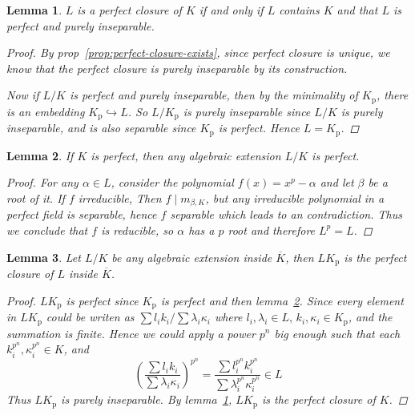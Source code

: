 \documentclass[a4paper]{article}
\newtheorem{lemma}{Lemma}
\theoremstyle{remark}
\theoremstyle{definition}
\theoremstyle{definition}
\theoremstyle{plain}
\begin{document}
  \begin{lemma} \label{lemma:perfect-closure-char}
    $L$ is a perfect closure of $K$ if and only if $L$ contains $K$ and that $L$ is perfect and
    purely inseparable.

    \begin{proof}
      By prop~\ref{prop:perfect-closure-exists}, since perfect closure is unique,
      we know that the perfect closure is purely inseparable by its construction.

      Now if $L/K$ is perfect and purely inseparable, then by the minimality of $K_\text{p}$,
      there is an embedding $K_\text{p} \hookrightarrow L$. So $L/K_\text{p}$ is purely inseparable
      since $L/K$ is purely inseparable, and is also separable since $K_\text{p}$ is perfect.
      Hence $L = K_\text{p}$.
    \end{proof}
  \end{lemma}

  \begin{lemma} \label{lemma:alg-ext-of-perfect-is-perfect}
    If $K$ is perfect, then any algebraic extension $L/K$ is perfect.

    \begin{proof}
      For any $\alpha \in L$, consider the polynomial $f(x) = x^p - \alpha$ and let $\beta$ be a
      root of it. If $f$ irreducible, Then $f \mid m_{\beta, K}$, but any irreducible polynomial in a perfect field
      is separable, hence $f$ separable which leads to an contradiction. Thus we conclude that $f$ is
      reducible, so $\alpha$ has a $p$ root and therefore $L^p = L$.
    \end{proof}
  \end{lemma}

  \begin{lemma} \label{lemma:perfect-closure-of-ext}
    Let $L/K$ be any algebraic extension inside $\overline{K}$, then $L K_\text{p}$ is
    the perfect closure of $L$ inside $\overline{K}$.

    \begin{proof}
      $L K_\text{p}$ is perfect since $K_\text{p}$ is perfect and then lemma~\ref{lemma:alg-ext-of-perfect-is-perfect}.
      Since every element in $L K_\text{p}$ could be writen as $\sum l_i k_i / \sum \lambda_i \kappa_i$ where
      $l_i, \lambda_i \in L, \, k_i, \kappa_i \in K_\text{p}$, and the summation is finite.
      Hence we could apply a power $p^n$ big enough such that each $k_i^{p^n} , \kappa_i^{p^n} \in K$, and
      \[ \left( \frac{\sum l_i k_i}{\sum \lambda_i \kappa_i} \right)^{p^n} =
        \frac{\sum l_i^{p^n} k_i^{p^n}}{\sum \lambda_i^{p^n} \kappa_i^{p^n}} \in L \]
      Thus $L K_\text{p}$ is purely inseparable. By lemma~\ref{lemma:perfect-closure-char}, $L K_\text{p}$
      is the perfect closure of $K$.
    \end{proof}
  \end{lemma}
\end{document}

